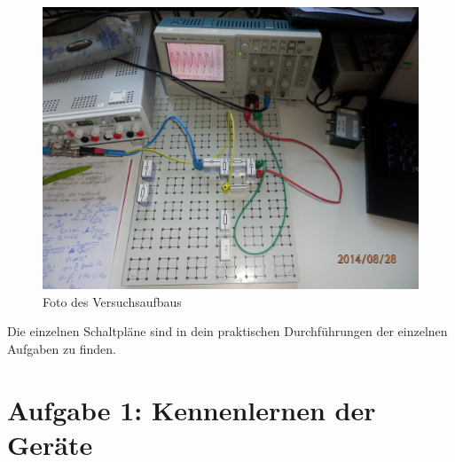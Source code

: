 \documentclass[12pt]{scrartcl}
\begin{document}
\begin{figure}[htbp] 
  \centering
    \includegraphics[scale = 0.1]{aufbau.JPG}
  	\caption[Foto des Versuchsaufbaus]{Foto des Versuchsaufbaus}
  \label{fig:teil_6}
\end{figure}

Die einzelnen Schaltpläne sind in dein praktischen Durchführungen der einzelnen Aufgaben zu finden.
\newpage

\section{Aufgabe 1: Kennenlernen der Geräte}
\end{document}
